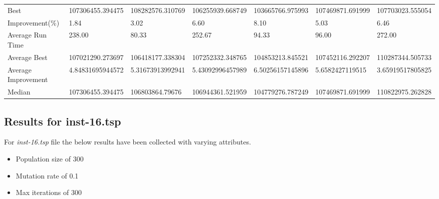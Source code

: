 \begin{table}[H]
{\begin{tabular}{lllllll}
\cellcolor[HTML]{ECF4FF}Best                & 107306455.394475 & 108282576.310769 & 106255939.668749 & 103665766.975993 & 107469871.691999 & 107703023.555054 \\
\cellcolor[HTML]{ECF4FF}Improvement(\%)     & 1.84             & 3.02             & 6.60             & 8.10             & 5.03             & 6.46             \\
\rowcolor[HTML]{CBCEFB} 
\cellcolor[HTML]{DAE8FC}Average Run Time    & 238.00           & 80.33            & 252.67           & 94.33            & 96.00            & 272.00           \\
\rowcolor[HTML]{CBCEFB} 
\cellcolor[HTML]{DAE8FC}Average Best        & 107021290.273697 & 106418177.338304 & 107252332.348765 & 104853213.845521 & 107452116.292207 & 110287344.505733 \\
\rowcolor[HTML]{CBCEFB} 
\cellcolor[HTML]{DAE8FC}Average Improvement & 4.84831695944572 & 5.31673913992941 & 5.43092996457989 & 6.50256157145896 & 5.6582427119515  & 3.65919517805825 \\
\rowcolor[HTML]{CBCEFB} 
\cellcolor[HTML]{DAE8FC}Median              & 107306455.394475 & 106803864.79676  & 106944361.521959 & 104779276.787249 & 107469871.691999 & 110822975.262828
\end{tabular}%
}
\end{table}

\subsection{Results for inst-16.tsp}

For \textit{inst-16.tsp} file the below results have been collected with varying attributes.

\begin{itemize}
  \item Population size of 300
  \item Mutation rate of 0.1
  \item Max iterations of 300
\end{itemize}

